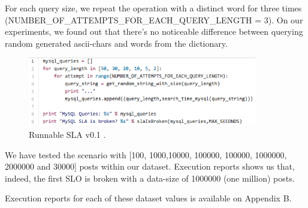 For each query size, we repeat the operation with a distinct word for three times (NUMBER\_OF\_ATTEMPTS\_FOR\_EACH\_QUERY\_LENGTH = 3). On our experiments, we found out that there's no noticeable difference between querying random generated ascii-chars and words from the dictionary.

\begin{figure}[ht!]
\centering
\includegraphics[width=100mm]{algorithmSLA01.png}
\caption{Runnable SLA v0.1 .\label{fig:algorithmSLA01}}
\end{figure}	

We have tested the scenario with [100, 1000,10000, 100000, 100000, 1000000, 2000000 and 30000] posts within our dataset. Execution reports shows us that, indeed, the first SLO is broken with a data-size of 1000000 (one million) posts.

Execution reports for each of these dataset values is available on Appendix B.






